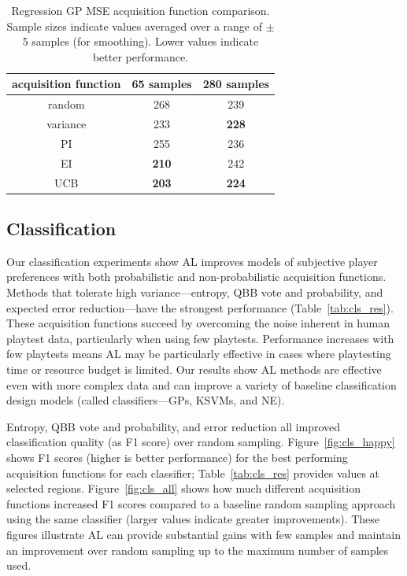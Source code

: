 \documentclass{sig-alternate}
\begin{document}
\begin{table}[tb]
\caption{Regression GP MSE acquisition function comparison.
Sample sizes indicate values averaged over a range of $\pm$5 samples (for smoothing).
Lower values indicate better performance.}
\centering
\begin{tabular}{|c|c|c|}
\hline
acquisition function & 65 samples   & 280 samples  \\ \hline
random               & 268          & 239          \\ \hline
variance             & 233          & \textbf{228} \\ \hline
PI                   & 255          & 236          \\ \hline
EI                   & \textbf{210} & 242          \\ \hline
UCB                  & \textbf{203} & \textbf{224} \\ \hline
\end{tabular}
\label{tab:reg_res}
\end{table}


\subsection{Classification}
Our classification experiments show AL improves models of subjective player preferences with both probabilistic and non-probabilistic acquisition functions.
Methods that tolerate high variance---entropy, QBB vote and probability, and expected error reduction---have the strongest performance (Table~\ref{tab:cls_res}).
These acquisition functions succeed by overcoming the noise inherent in human playtest data, particularly when using few playtests.
Performance increases with few playtests means AL may be particularly effective in cases where playtesting time or resource budget is limited.
Our results show AL methods are effective even with more complex data and can improve a variety of baseline classification design models (called classifiers---GPs, KSVMs, and NE).



Entropy, QBB vote and probability, and error reduction all improved classification quality (as F1 score) over random sampling.
Figure~\ref{fig:cls_happy} shows F1 scores (higher is better performance) for the best performing acquisition functions for each classifier; Table~\ref{tab:cls_res} provides values at selected regions.
Figure~\ref{fig:cls_all} shows how much different acquisition functions increased F1 scores compared to a baseline random sampling approach using the same classifier (larger values indicate greater improvements).
These figures illustrate AL can provide substantial gains with few samples and maintain an improvement over random sampling up to the maximum number of samples used.
\end{document}
